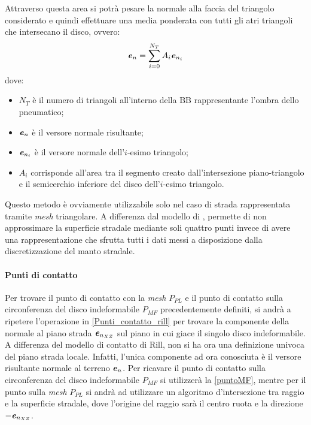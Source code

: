 Attraverso questa area si potrà pesare la normale alla faccia del triangolo considerato e quindi effettuare una media ponderata con tutti gli atri triangoli che intersecano il disco, ovvero:
%
\begin{equation}
\textbf{\textit{e}}_n = \sum_{i=0}^{N_T}A_i\textbf{\textit{e}}_{n_i}
\label{ponderata}
\end{equation}
%
dove:
\begin{itemize}
	\item $N_T$ è il numero di triangoli all'interno della \ac{BB} rappresentante l'ombra dello pneumatico;
	\item $\textbf{\textit{e}}_n$ è il versore normale risultante;
	\item $\textbf{\textit{e}}_{n_i}$ è il versore normale dell'$i$-esimo triangolo;
	\item $A_i$ corrisponde all'area tra il segmento creato dall'intersezione piano-triangolo e il semicerchio inferiore del disco dell'$i$-esimo triangolo.
\end{itemize}

Questo metodo è ovviamente utilizzabile solo nel caso di strada rappresentata tramite \textit{mesh} triangolare. A differenza dal modello di \cite{Rill}, permette di non approssimare la superficie stradale mediante soli quattro punti invece di avere una rappresentazione che sfrutta tutti i dati messi a disposizione dalla discretizzazione del manto stradale.
%
\paragraph{Punti di contatto}
Per trovare il punto di contatto con la \textit{mesh} $P_{PL}$ e il punto di contatto sulla circonferenza del disco indeformabile $P_{MF}$ precedentemente definiti, si andrà a ripetere l'operazione in \ref{Punti_contatto_rill} per trovare la componente della normale al piano strada $\textbf{\textit{e}}_{n_{XZ}}$ sul piano in cui giace il singolo disco indeformabile. A differenza del modello di contatto di Rill, non si ha ora una definizione univoca del piano strada locale. Infatti, l'unica componente ad ora conosciuta è il versore risultante normale al terreno $\textbf{\textit{e}}_n$. Per ricavare il punto di contatto sulla circonferenza del disco indeformabile $P_{MF}$ si utilizzerà la \eqref{puntoMF}, mentre per il punto sulla \textit{mesh} $P_{PL}$ si andrà ad utilizzare un algoritmo d'intersezione tra raggio e la superficie stradale, dove l'origine del raggio sarà il centro ruota e la direzione $-\textbf{\textit{e}}_{n_{XZ}}$.
%
